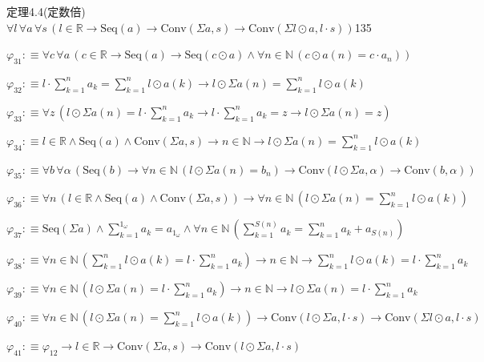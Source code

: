 \begin{fullproof}{定理4.4(定数倍)}{$\forall l\,\forall a\,\forall s\,(l \in \mathbb{R} \to \mathrm{Seq}(a) \to \mathrm{Conv}(\Sigma a,s) \to \mathrm{Conv}(\Sigma l \odot a,l \cdot s))$}{135}
\begin{abbrevlist}
\item $\varphi_{31} :\equiv \forall c\,\forall a\,(c \in \mathbb{R} \to \mathrm{Seq}(a) \to \mathrm{Seq}(c \odot a) \land \forall n \in \mathbb{N}\,(c \odot a(n) = c \cdot a_{n}))$
\item $\varphi_{32} :\equiv l \cdot {\textstyle\sum_{k=1}^{n} a_{k}} = {\textstyle\sum_{k=1}^{n} l \odot a(k)} \to l \odot \Sigma a(n) = {\textstyle\sum_{k=1}^{n} l \odot a(k)}$
\item $\varphi_{33} :\equiv \forall z\,(l \odot \Sigma a(n) = l \cdot {\textstyle\sum_{k=1}^{n} a_{k}} \to l \cdot {\textstyle\sum_{k=1}^{n} a_{k}} = z \to l \odot \Sigma a(n) = z)$
\item $\varphi_{34} :\equiv l \in \mathbb{R} \land \mathrm{Seq}(a) \land \mathrm{Conv}(\Sigma a,s) \to n \in \mathbb{N} \to l \odot \Sigma a(n) = {\textstyle\sum_{k=1}^{n} l \odot a(k)}$
\item $\varphi_{35} :\equiv \forall b\,\forall \alpha\,(\mathrm{Seq}(b) \to \forall n \in \mathbb{N}\,(l \odot \Sigma a(n) = b_{n}) \to \mathrm{Conv}(l \odot \Sigma a,\alpha) \to \mathrm{Conv}(b,\alpha))$
\item $\varphi_{36} :\equiv \forall n\,(l \in \mathbb{R} \land \mathrm{Seq}(a) \land \mathrm{Conv}(\Sigma a,s)) \to \forall n \in \mathbb{N}\,(l \odot \Sigma a(n) = {\textstyle\sum_{k=1}^{n} l \odot a(k)})$
\item $\varphi_{37} :\equiv \mathrm{Seq}(\Sigma a) \land {\textstyle\sum_{k=1}^{1_{\omega}} a_{k}} = a_{1_{\omega}} \land \forall n \in \mathbb{N}\,({\textstyle\sum_{k=1}^{S(n)} a_{k}} = {\textstyle\sum_{k=1}^{n} a_{k}} + a_{S(n)})$
\item $\varphi_{38} :\equiv \forall n \in \mathbb{N}\,({\textstyle\sum_{k=1}^{n} l \odot a(k)} = l \cdot {\textstyle\sum_{k=1}^{n} a_{k}}) \to n \in \mathbb{N} \to {\textstyle\sum_{k=1}^{n} l \odot a(k)} = l \cdot {\textstyle\sum_{k=1}^{n} a_{k}}$
\item $\varphi_{39} :\equiv \forall n \in \mathbb{N}\,(l \odot \Sigma a(n) = l \cdot {\textstyle\sum_{k=1}^{n} a_{k}}) \to n \in \mathbb{N} \to l \odot \Sigma a(n) = l \cdot {\textstyle\sum_{k=1}^{n} a_{k}}$
\item $\varphi_{40} :\equiv \forall n \in \mathbb{N}\,(l \odot \Sigma a(n) = {\textstyle\sum_{k=1}^{n} l \odot a(k)}) \to \mathrm{Conv}(l \odot \Sigma a,l \cdot s) \to \mathrm{Conv}(\Sigma l \odot a,l \cdot s)$
\item $\varphi_{41} :\equiv \varphi_{12} \to l \in \mathbb{R} \to \mathrm{Conv}(\Sigma a,s) \to \mathrm{Conv}(l \odot \Sigma a,l \cdot s)$

\end{abbrevlist}
\end{fullproof}
